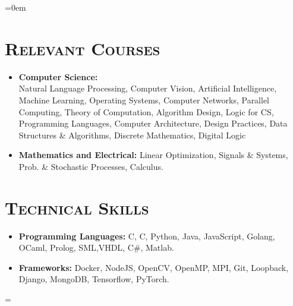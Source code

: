 \documentclass{article}
\newenvironment{longversion}{}{} %
\newenvironment{absolutelynopagebreak}
  {\par\nobreak\vfil\penalty0\vfilneg
   \vtop\bgroup}
  {\par\xdef\tpd{\the\prevdepth}\egroup
   \prevdepth=\tpd}
\newcommand{\CPP}
{C\nolinebreak[4]\hspace{-.05em}\raisebox{.22ex}{\footnotesize\bf ++}}
\newcommand{\tmpsection}[1]{}
\let\tmpsection=\section
\renewcommand{\section}[1]{\tmpsection*{\textsc{#1}}}
\begin{document}
\begin{absolutelynopagebreak}
\begin{longversion}
\begin{list} {}{\leftmargin=0em}
\end{list}


\end{longversion}

\begin{longversion}
\section{Relevant Courses}
\begin{itemize}
\setlength\itemsep{-1em}
\item \textbf{Computer Science:} \hfill \\
Natural Language Processing, Computer Vision, Artificial Intelligence, Machine Learning, Operating Systems, Computer Networks, Parallel Computing, Theory of Computation, Algorithm Design, Logic for CS, Programming Languages, Computer Architecture, Design Practices, Data Structures \& Algorithms, Discrete Mathematics, Digital Logic\\
\item \textbf{Mathematics and Electrical:}
Linear Optimization, Signals \& Systems, Prob. \& Stochastic Processes, Calculus.
\end{itemize}
\end{longversion}

\begin{longversion}
\section{Technical Skills}\begin{itemize}
\item \textbf{Programming Languages:}  C, \CPP, Python, Java, JavaScript, Golang, OCaml, Prolog, SML,VHDL, C\#, Matlab.
\item \textbf{Frameworks:} Docker, NodeJS, OpenCV, OpenMP, MPI, Git, Loopback, Django, MongoDB, Tensorflow, PyTorch.

\end{itemize}


\end{longversion}
\end{absolutelynopagebreak}
\end{document}
